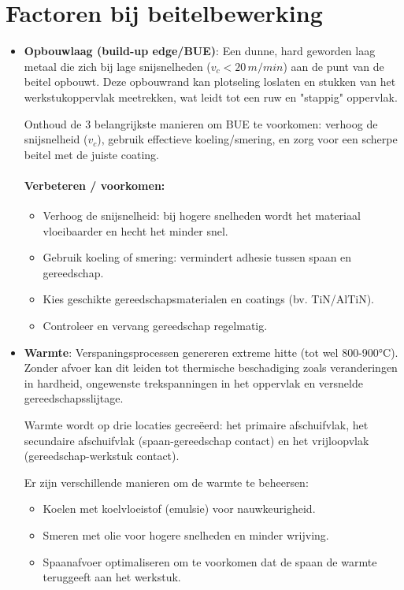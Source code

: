 \documentclass[a4paper,12pt,twoside]{report}
\begin{document}
\section{Factoren bij beitelbewerking}
\begin{itemize}
	\item \textbf{Opbouwlaag (build-up edge/BUE)}:
	      Een dunne, hard geworden laag metaal die zich bij lage snijsnelheden ($v_c < 20\,\si{m/min}$) aan de punt van de beitel opbouwt. Deze opbouwrand kan plotseling loslaten en stukken van het werkstukoppervlak meetrekken, wat leidt tot een ruw en "stappig" oppervlak.

	      \begin{examenbox}
              Onthoud de 3 belangrijkste manieren om BUE te voorkomen: verhoog de snijsnelheid ($v_c$), gebruik effectieve koeling/smering, en zorg voor een scherpe beitel met de juiste coating.
          \end{examenbox}

	      \paragraph{Verbeteren / voorkomen:}
	      \begin{itemize}
		      \item Verhoog de snijsnelheid: bij hogere snelheden wordt het materiaal vloeibaarder en hecht het minder snel.
		      \item Gebruik koeling of smering: vermindert adhesie tussen spaan en gereedschap.
		      \item Kies geschikte gereedschapsmaterialen en coatings (bv. TiN/AlTiN).
		      \item Controleer en vervang gereedschap regelmatig.
	      \end{itemize}

	\item \textbf{Warmte}:
	      Verspaningsprocessen genereren extreme hitte (tot wel 800-900°C). Zonder afvoer kan dit leiden tot thermische beschadiging zoals veranderingen in hardheid, ongewenste trekspanningen in het oppervlak en versnelde gereedschapsslijtage.

          Warmte wordt op drie locaties gecreëerd: het primaire afschuifvlak, het secundaire afschuifvlak (spaan-gereedschap contact) en het vrijloopvlak (gereedschap-werkstuk contact).

	      Er zijn verschillende manieren om de warmte te beheersen:
	      \begin{itemize}
		      \item Koelen met koelvloeistof (emulsie) voor nauwkeurigheid.
		      \item Smeren met olie voor hogere snelheden en minder wrijving.
		      \item Spaanafvoer optimaliseren om te voorkomen dat de spaan de warmte teruggeeft aan het werkstuk.
	      \end{itemize}


\end{itemize}
\end{document}
